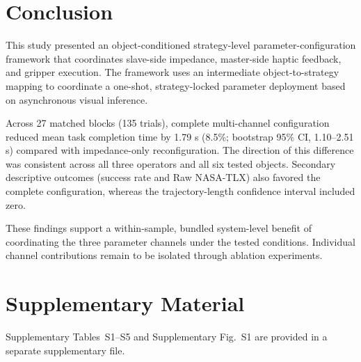 \section{Conclusion}
This study presented an object-conditioned strategy-level parameter-configuration framework that coordinates slave-side impedance, master-side haptic feedback, and gripper execution. The framework uses an intermediate object-to-strategy mapping to coordinate a one-shot, strategy-locked parameter deployment based on asynchronous visual inference.

Across 27 matched blocks (135 trials), complete multi-channel configuration reduced mean task completion time by 1.79 s (8.5\%; bootstrap 95\% CI, 1.10--2.51 s) compared with impedance-only reconfiguration. The direction of this difference was consistent across all three operators and all six tested objects. Secondary descriptive outcomes (success rate and Raw NASA-TLX) also favored the complete configuration, whereas the trajectory-length confidence interval included zero.

These findings support a within-sample, bundled system-level benefit of coordinating the three parameter channels under the tested conditions. Individual channel contributions remain to be isolated through ablation experiments.

\section*{Supplementary Material}
Supplementary Tables~S1--S5 and Supplementary Fig.~S1 are provided in a separate supplementary file.
